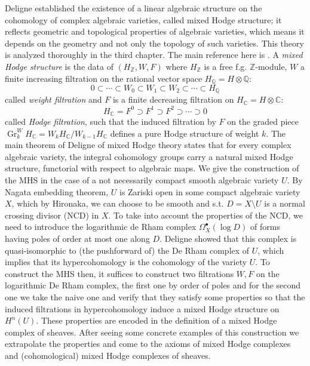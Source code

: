 \documentclass{article}
\DeclareMathOperator{\Gr}{Gr}
\newcommand{\CC}{\mathbb{C}}
\newcommand{\QQ}{\mathbb{Q}}
\newcommand{\ZZ}{\mathbb{Z}}
\numberwithin{equation}{section}
\begin{document}
Deligne established the existence of a linear algebraic structure on the cohomology of complex algebraic varieties, called mixed Hodge structure; it reflects geometric and topological properties of algebraic varieties, which means it depends on the geometry and not only the topology of such varieties. This theory is analyzed thoroughly in the third chapter. The main reference here is \cite{PS08}.
A \emph{mixed Hodge structure} is the data of $(H_\ZZ,W,F)$ where $H_\ZZ$ is a free f.g. $\ZZ$-module, $W$ a finite increasing filtration on the rational vector space $H_\QQ = H \otimes \QQ$:
\[
{0}\subset\cdots\subset W_0\subset W_1\subset W_2\subset \cdots\subset H_\QQ
\] 
called \emph{weight filtration} and $F$ is a finite decreasing filtration on $H_\CC =H \otimes \CC$:
\[
H_{\CC} =F^0\supset F^{1}\supset F^2\supset\cdots\supset{0}
\] 
called \emph{Hodge filtration}, such that the induced filtration by $F$ on the graded piece $\Gr^W_k H_\CC=W_{k}H_\CC/W_{k-1}H_\CC$ defines a pure Hodge structure of weight $k$.
The main theorem of Deligne of mixed Hodge theory states that for every complex algebraic variety, the integral cohomology groups carry a natural mixed Hodge structure, functorial with respect to algebraic maps.
We give the construction of the MHS in the case of a not necessarily compact smooth algebraic variety $U$. By Nagata embedding theorem, $U$ is Zariski open in some compact algebraic variety $X$, which by Hironaka, we can choose to be smooth and s.t. $D=X \setminus U$ is a normal crossing divisor (NCD) in $X$. To take into account the properties of the NCD, we need to introduce the logarithmic de Rham complex $\Omega^\bullet_X ( \log D)$ of forms having poles of order at most one along $D$. Deligne showed that this complex is quasi-isomorphic to (the pushforward of) the De Rham complex of $U$, which implies that its hypercohomology is the cohomology of the variety $U$. To construct the MHS then, it suffices to construct two filtrations $W,F$ on the logarithmic De Rham complex, the first one by order of poles and for the second one we take the naive one and verify that they satisfy some properties so that the induced filtrations in hypercohomology induce a mixed Hodge structure on $H^n(U)$. These properties are encoded in the definition of a mixed Hodge complex of sheaves. After seeing some concrete examples of this construction we extrapolate the properties and come to the axioms of mixed Hodge complexes and (cohomological) mixed Hodge complexes of sheaves.
\end{document}
